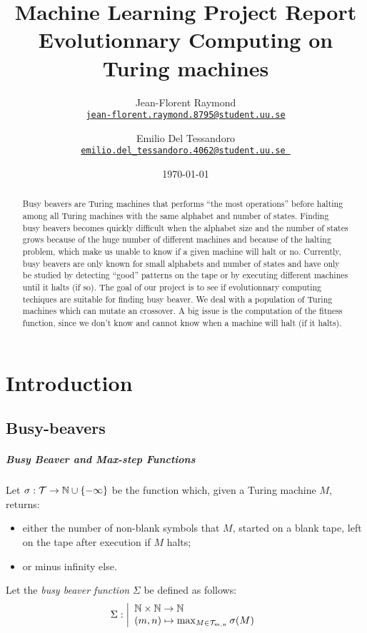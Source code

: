\documentclass{report}
\title{Machine Learning Project Report\\\textbf{Evolutionnary Computing on\\Turing machines}}
\author{Jean-Florent Raymond\\\href{mailto:jean-florent.raymond.8795@student.uu.se}{\texttt{jean-florent.raymond.8795@student.uu.se}} \and Emilio Del Tessandoro\\
\href{mailto:emilio.del_tessandoro.4062@student.uu.se }{\texttt{emilio.del\_tessandoro.4062@student.uu.se }}}
\date{\today}
\begin{document}
\maketitle

\begin{abstract}
  Busy beavers are Turing machines that performs ``the most operations'' before halting among all Turing machines with the same alphabet and number of states. Finding busy beavers becomes quickly difficult when the alphabet size and the number of states grows because of the huge number of different machines and because of the halting problem, which make us unable to know if a given machine will halt or no. Currently, busy beavers are only known for small alphabets and number of states and have only be studied by detecting ``good'' patterns on the tape or by executing different machines until it halts (if so).
The goal of our project is to see if evolutionnary computing techiques are suitable for finding busy beaver. We deal with a population of Turing machines which can mutate an crossover. A big issue is the computation of the fitness function, since we don't know and cannot know when a machine will halt (if it halts).
\end{abstract}

\chapter{Introduction}
\label{chap:intro}

\section{Busy-beavers}
\label{chap:bb}
\paragraph{Busy Beaver and Max-step Functions}
Let $\sigma : \mathcal{T} \to \mathbb{N} \cup \{-\infty\}$ be the function which, given a Turing machine $M$, returns:
\begin{itemize}
\item either the number of non-blank symbols that $M$, started on a blank tape, left on the tape after execution if $M$ halts;
\item or minus infinity else.
\end{itemize}

Let the \emph{busy beaver function} $\Sigma$ be defined as follows:
\[
\Sigma : \left |
\begin{array}{l}
\mathbb{N} \times \mathbb{N} \to \mathbb{N}\\
(m,n) \mapsto \max_{M \in \mathcal{T}_{m,n}} \sigma(M)
\end{array}
\right .
\]
\end{document}
